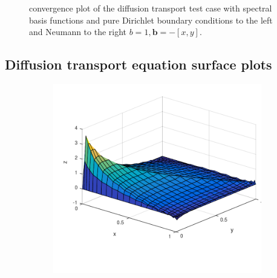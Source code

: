 \begin{figure}[h!]
\begin{subfigure}[b]{0.48\textwidth}
  \end{subfigure}
  \vspace{-0.1\baselineskip}
	\caption{convergence plot of the diffusion transport test case with spectral basis functions and pure Dirichlet boundary conditions to the left and Neumann to the right  $b = 1,\mathbf{b} = -[x,y]$.}
  \label{fig:ConvergenceDifftransSpec}
\end{figure}
%

\newpage
\subsection{Diffusion transport equation surface plots}
%
\begin{figure}[h]
  \centering
  \begin{subfigure}[b]{0.48\textwidth}
	\includegraphics[width=\textwidth]{Figures/Spec_difftrans_aNeg.pdf}
  \end{subfigure}%
  \quad
  \begin{subfigure}[b]{0.48\textwidth}

\end{subfigure}
\end{figure}
